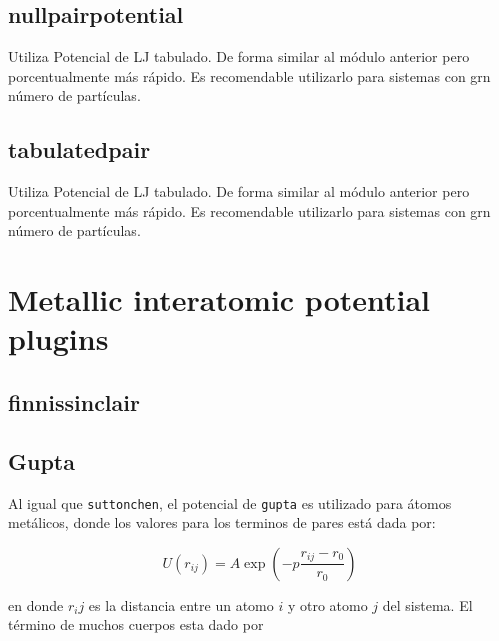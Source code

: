 
\subsection{nullpairpotential}
Utiliza Potencial de LJ tabulado. De forma similar al m\'odulo anterior pero
porcentualmente m\'as r\'apido. Es recomendable utilizarlo para sistemas con grn
n\'umero de part\'iculas.

\subsection{tabulatedpair}
Utiliza Potencial de LJ tabulado. De forma similar al m\'odulo anterior pero
porcentualmente m\'as r\'apido. Es recomendable utilizarlo para sistemas con grn
n\'umero de part\'iculas.


\section{Metallic interatomic potential plugins}

\subsection{finnissinclair}

\subsection{Gupta}

Al igual que \verb|suttonchen|, el potencial de \verb|gupta| es utilizado para
\'atomos met\'alicos, donde los valores para los terminos de pares est\'a dada
por:

$$U(r_{ij}) = A\exp{\left(-p\frac{r_{ij}-r_0}{r_0}\right)}$$

en donde $r_ij$ es la distancia entre un atomo $i$ y otro atomo $j$ del sistema.
El t\'ermino de muchos cuerpos esta dado por

